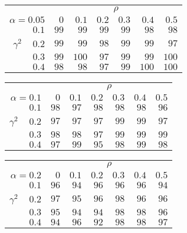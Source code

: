 \begin{tabular}{r|rrrrrr}
\hline\hline
 &\multicolumn{6}{c}{$\rho$} \\ 
 $\alpha = 0.05$ & $0$ & $0.1$ & $0.2$ & $0.3$ & $0.4$ & $0.5$ \\ 
 \hline$0.1$ & $ 99$ & $ 99$ & $ 99$ & $ 99$ & $ 98$ & $ 98$\\ 
$\gamma^2\;\;\;$ $0.2$ & $ 99$ & $ 99$ & $ 98$ & $ 99$ & $ 99$ & $ 97$\\ 
$0.3$ & $ 99$ & $100$ & $ 97$ & $ 99$ & $ 99$ & $100$\\ 
$0.4$ & $ 98$ & $ 98$ & $ 97$ & $ 99$ & $100$ & $100$\\ 
 \hline 
 \end{tabular}
 
 \vspace{2em} 
 
\begin{tabular}{r|rrrrrr}
\hline\hline
 &\multicolumn{6}{c}{$\rho$} \\ 
 $\alpha = 0.1$ & $0$ & $0.1$ & $0.2$ & $0.3$ & $0.4$ & $0.5$ \\ 
 \hline$0.1$ & $98$ & $97$ & $98$ & $98$ & $98$ & $96$\\ 
$\gamma^2\;\;\;$ $0.2$ & $97$ & $97$ & $97$ & $99$ & $99$ & $97$\\ 
$0.3$ & $98$ & $98$ & $97$ & $99$ & $99$ & $99$\\ 
$0.4$ & $97$ & $99$ & $95$ & $98$ & $99$ & $98$\\ 
 \hline 
 \end{tabular}
 
 \vspace{2em} 
 
\begin{tabular}{r|rrrrrr}
\hline\hline
 &\multicolumn{6}{c}{$\rho$} \\ 
 $\alpha = 0.2$ & $0$ & $0.1$ & $0.2$ & $0.3$ & $0.4$ & $0.5$ \\ 
 \hline$0.1$ & $96$ & $94$ & $96$ & $96$ & $96$ & $94$\\ 
$\gamma^2\;\;\;$ $0.2$ & $97$ & $95$ & $96$ & $98$ & $96$ & $96$\\ 
$0.3$ & $95$ & $94$ & $94$ & $98$ & $98$ & $96$\\ 
$0.4$ & $94$ & $96$ & $92$ & $98$ & $98$ & $97$\\ 
 \hline 
 \end{tabular}